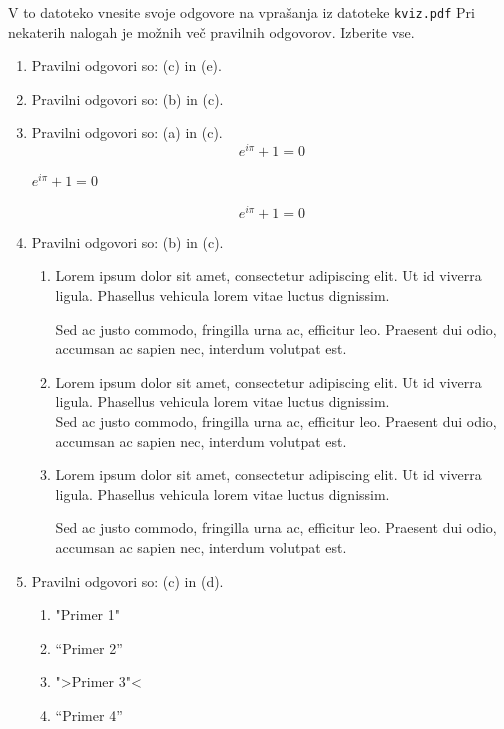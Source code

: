 \documentclass[11pt]{article}
\begin{document}
V to datoteko vnesite svoje odgovore na vprašanja iz datoteke \texttt{kviz.pdf}
Pri nekaterih nalogah je možnih več pravilnih odgovorov. Izberite vse.

\begin{enumerate}
    \item Pravilni odgovori so: (c) in (e).%
    
    \item Pravilni odgovori so: (b) in (c).%
    
    \item Pravilni odgovori so: (a) in (c).%
      \[ e^{i \pi} + 1 = 0 \]
      \begin{center}
          \( e^{i \pi} + 1 = 0 \)
      \end{center}
      \begin{equation*}
          e^{i \pi} + 1 = 0
      \end{equation*}

    \item Pravilni odgovori so: (b) in (c).%
        \begin{enumerate}
            \item {
Lorem ipsum dolor sit amet, consectetur adipiscing 
elit. Ut id viverra ligula. Phasellus vehicula lorem 
vitae luctus dignissim. 
                
Sed ac justo commodo, fringilla urna ac, efficitur 
leo. Praesent dui odio, accumsan ac sapien nec, 
interdum volutpat est. 
            }
            \item {
Lorem ipsum dolor sit amet, consectetur adipiscing 
elit. Ut id viverra ligula. Phasellus vehicula lorem 
vitae luctus dignissim. \\
Sed ac justo commodo, fringilla urna ac, efficitur 
leo. Praesent dui odio, accumsan ac sapien nec, 
interdum volutpat est.             }
            \item {
Lorem ipsum dolor sit amet, consectetur adipiscing 
elit. Ut id viverra ligula. Phasellus vehicula lorem 
vitae luctus dignissim. \par
Sed ac justo commodo, fringilla urna ac, efficitur 
leo. Praesent dui odio, accumsan ac sapien nec, 
interdum volutpat est.             }
        \end{enumerate}
    
      \item Pravilni odgovori so: (c) in (d).%
        \begin{enumerate}
          \item "Primer 1"
          \item ``Primer 2''
          \item ">Primer 3"<
          \item "`Primer 4"'
        \end{enumerate}


\end{enumerate}
\end{document}
